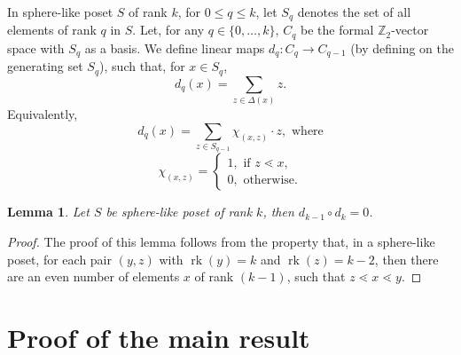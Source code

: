 \documentclass[12pt]{article}
\newtheorem{lemma}[theorem]{Lemma}
\theoremstyle{definition}
\theoremstyle{remark}
\newcommand{\rk}{\operatorname{rk}}
\begin{document}
	 
	 	
	  In sphere-like poset $S$ of rank $k$, for $0\leq q\leq k$, let $S_q$ denotes the set of all elements of rank $q$ in $S$. Let, for any $q\in \{0,\ldots,k\}$, $C_q$ be the formal $\mathbb{Z}_2$-vector space with $S_q$ as a basis. We define linear maps $d_q: C_q \rightarrow C_{q-1}$ (by defining on the generating set $S_q$), such that, for $x\in S_q$,
	  \[d_q(x)= \sum_{z\in \Delta(x)}z.\]
	  Equivalently,
	 \[d_q(x)= \sum_{z\in S_{q-1}} \chi_{(x,z)}\cdot z, \text{ where}\]
	 \[ \chi_{(x,z)}=\begin{cases}
	     1, \text{ if } z\lessdot x,\\
	     0, \text{ otherwise.}
	 \end{cases}\]
	
	\begin{lemma}\label{poincare}
		Let  $S$ be sphere-like poset of rank $k$, then $d_{k-1}\circ d_{k}=0$.
	\end{lemma}
	\begin{proof}
		The proof of this lemma follows from the property that, in a sphere-like poset,  for each pair $(y,z)$ with $\rk(y)=k$ and $\rk(z)=k-2$, then there are an even number of elements $x$ of rank $(k-1)$, such that $z\lessdot x\lessdot y$.
	\end{proof}
	


	
	\section{Proof of the main result}
	 
\end{document}
